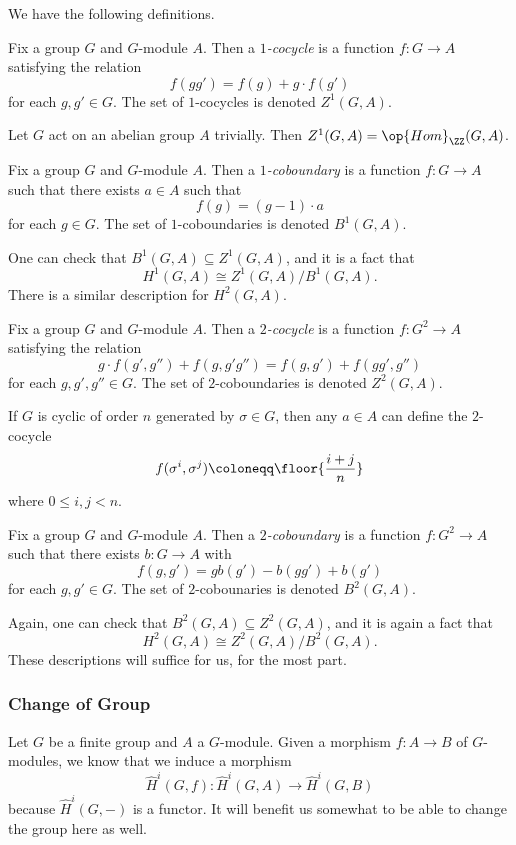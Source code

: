 We have the following definitions.
\begin{definition}
	Fix a group $G$ and $G$-module $A$. Then a \textit{$1$-cocycle} is a function $f\colon G\to A$ satisfying the relation
	\[f(gg')=f(g)+g\cdot f(g')\]
	for each $g,g'\in G$. The set of $1$-cocycles is denoted $Z^1(G,A)$.
\end{definition}
\begin{example}
	Let $G$ act on an abelian group $A$ trivially. Then $Z^1(G,A)=\op{Hom}_\ZZ(G,A)$.
\end{example}
\begin{definition}
	Fix a group $G$ and $G$-module $A$. Then a \textit{$1$-coboundary} is a function $f\colon G\to A$ such that there exists $a\in A$ such that
	\[f(g)=(g-1)\cdot a\]
	for each $g\in G$. The set of $1$-coboundaries is denoted $B^1(G,A)$.
\end{definition}
One can check that $B^1(G,A)\subseteq Z^1(G,A)$, and it is a fact that
\[H^1(G,A)\cong Z^1(G,A)/B^1(G,A).\]
There is a similar description for $H^2(G,A)$.
\begin{definition}
	Fix a group $G$ and $G$-module $A$. Then a \textit{$2$-cocycle} is a function $f\colon G^2\to A$ satisfying the relation
	\[g\cdot f(g',g'')+f(g,g'g'')=f(g,g')+f(gg',g'')\]
	for each $g,g',g''\in G$. The set of $2$-coboundaries is denoted $Z^2(G,A)$.
\end{definition}
\begin{example}
	If $G$ is cyclic of order $n$ generated by $\sigma\in G$, then any $a\in A$ can define the $2$-cocycle
	\[f(\sigma^i,\sigma^j)\coloneqq\floor{\frac{i+j}n}\]
	where $0\le i,j<n$.
\end{example}
\begin{definition}
	Fix a group $G$ and $G$-module $A$. Then a \textit{$2$-coboundary} is a function $f\colon G^2\to A$ such that there exists $b\colon G\to A$ with
	\[f(g,g')=gb(g')-b(gg')+b(g')\]
	for each $g,g'\in G$. The set of $2$-cobounaries is denoted $B^2(G,A)$.
\end{definition}
Again, one can check that $B^2(G,A)\subseteq Z^2(G,A)$, and it is again a fact that
\[H^2(G,A)\cong Z^2(G,A)/B^2(G,A).\]
These descriptions will suffice for us, for the most part.

\subsubsection{Change of Group}
Let $G$ be a finite group and $A$ a $G$-module. Given a morphism $f\colon A\to B$ of $G$-modules, we know that we induce a morphism
\[\widehat H^i(G,f)\colon\widehat H^i(G,A)\to\widehat H^i(G,B)\]
because $\widehat H^i(G,-)$ is a functor. It will benefit us somewhat to be able to change the group here as well.


